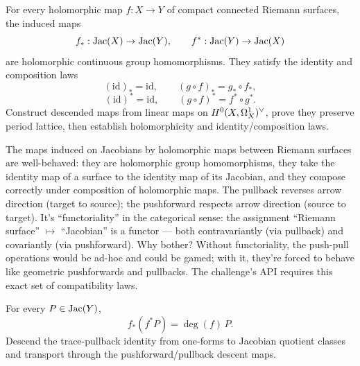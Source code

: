 \begin{theorem}
\label{thm:push-pull-functoriality}
For every holomorphic map \(f : X \to Y\) of compact connected Riemann
surfaces, the induced maps
\[
  f_{*} : \operatorname{Jac}(X) \to \operatorname{Jac}(Y),\qquad
  f^{*} : \operatorname{Jac}(Y) \to \operatorname{Jac}(X)
\]
are holomorphic continuous group homomorphisms. They satisfy the
identity and composition laws
\[
  (\mathrm{id})_*=\mathrm{id},\qquad (g\circ f)_*=g_*\circ f_*,
\]
\[
  (\mathrm{id})^{*}=\mathrm{id},\qquad (g\circ f)^{*}=f^{*}\circ g^{*}.
\]
\leanok
\proofplan
Construct descended maps from linear maps on \(H^{0}(X,\Omega^{1}_{X})^{\vee}\), prove they preserve
period lattice, then establish holomorphicity and identity/composition laws.
\end{theorem}

\begin{layman}
The maps induced on Jacobians by holomorphic maps between Riemann
surfaces are well-behaved: they are holomorphic group homomorphisms,
they take the identity map of a surface to the identity map of its
Jacobian, and they compose correctly under composition of holomorphic
maps. The pullback reverses arrow direction (target to source); the
pushforward respects arrow direction (source to target). It's
``functoriality'' in the categorical sense: the assignment
``Riemann surface'' \(\mapsto\) ``Jacobian'' is a functor --- both
contravariantly (via pullback) and covariantly (via pushforward).
Why bother? Without functoriality, the push-pull operations would be
ad-hoc and could be gamed; with it, they're forced to behave like
geometric pushforwards and pullbacks. The challenge's API
requires this exact set of compatibility laws.
\end{layman}

\begin{theorem}
\label{thm:pushforward-pullback}
For every \(P\in\operatorname{Jac}(Y)\),
\[
  f_{*}(f^{*}P)=\deg(f)\,P.
\]
\leanok
\proofplan
Descend the trace-pullback identity from one-forms to Jacobian quotient classes
and transport through the pushforward/pullback descent maps.
\end{theorem}

